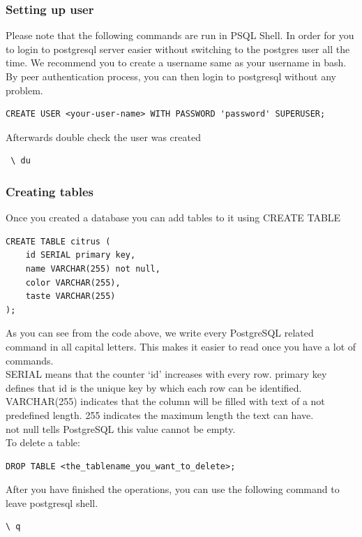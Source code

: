 \documentclass[a4paper]{article}
\begin{document}
\subsubsection{Setting up user}
Please note that the following commands are run in PSQL Shell. In order for you to login to postgresql server easier without switching to the postgres user all the time. We recommend you to create a username same as your username in bash. By peer authentication process, you can then login to postgresql without any problem.
\begin{lstlisting}
CREATE USER <your-user-name> WITH PASSWORD 'password' SUPERUSER;
\end{lstlisting}
Afterwards double check the user was created
\begin{lstlisting}
 \ du
\end{lstlisting}
\subsubsection{Creating tables}
Once you created a database you can add tables to it using CREATE TABLE
\begin{lstlisting}
CREATE TABLE citrus (
    id SERIAL primary key,
    name VARCHAR(255) not null,
    color VARCHAR(255),
    taste VARCHAR(255)
);
\end{lstlisting}
As you can see from the code above, we write every PostgreSQL related command in all capital letters. This makes it easier to read once you have a lot of commands.\\

SERIAL means that the counter ‘id’ increases with every row. primary key defines that id is the unique key by which each row can be identified.\\

VARCHAR(255) indicates that the column will be filled with text of a not predefined length. 255 indicates the maximum length the text can have.\\

not null tells PostgreSQL this value cannot be empty.\\

To delete a table:
\begin{lstlisting}
DROP TABLE <the_tablename_you_want_to_delete>;
\end{lstlisting}
After you have finished the operations, you can use the following command to leave postgresql shell.
\begin{lstlisting}
\ q
\end{lstlisting}
\begin{eg}

\end{eg}
\end{document}
